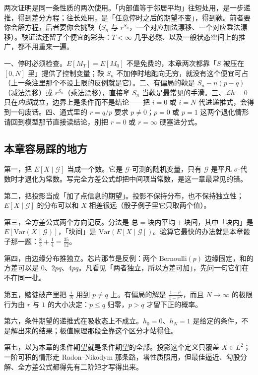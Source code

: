 \begin{remark}
两次证明是同一条性质的两次使用。「内部值等于邻居平均」往短处用，是一步递推，得到差分方程；往长处用，是「任意停时之后的期望不变」，得到鞅。前者要你会解方程，后者要你会挑鞅（$S_n$ 与 $r^{S_n}$，一个对应加法漂移、一个对应乘法漂移）。鞅证法还留了个便宜的彩头：$T<\infty$ 几乎必然、以及一般状态空间上的推广，都不用重来一遍。
\end{remark}

\begin{remark}[顺手记下四条边界]
一、停时必须检查。$E[M_T]=E[M_0]$ 不是免费的，本章两次都靠「$S$ 被压在 $[0,N]$ 里」提供了控制变量；鞅 $S_n$ 不加停时地跑向无穷，就没有这个便宜可占（上一条注里那个不设上限的反例就是它）。二、有偏局的鞅是 $S_n-n(p-q)$（减法漂移）或 $r^{S_n}$（乘法漂移），直接拿 $S_n$ 当鞅是最常见的手滑。三、$\mathcal{L}h=0$ 只在\emph{内部}成立，边界上是条件而不是结论——把 $i=0$ 或 $i=N$ 代进递推式，会得到一句废话。四、通式里的 $r=q/p$ 要求 $p\ne0$；$p=0$ 或 $p=1$ 这两个退化情形请回到模型那节直接读结论，别把 $r=0$ 或 $r=\infty$ 硬塞进分式。
\end{remark}

\subsection{本章容易踩的地方}

第一，把 $E[X\mid\mathcal{G}]$ 当成一个数。它是 $\mathcal{G}$-可测的随机变量，只有 $\mathcal{G}$ 是平凡 $\sigma$-代数时才退化为常数。写完全方差公式却把中间项当常数，是这一章最常见的错。

第二，把投影当成「加了点信息的期望」。投影不保持分布，也不保持独立性；$E[X\mid\mathcal{G}]$ 的分布可以和 $X$ 相差很远（骰子例子里它只取两个值）。

第三，全方差公式两个方向记反。分法是 $\text{总}=\text{块内平均}+\text{块间}$，其中「块内」是 $E[\mathrm{Var}(X\mid\mathcal{G})]$，「块间」是 $\mathrm{Var}(E[X\mid\mathcal{G}])$。验算它最快的办法就是本章骰子那一题：$\frac83+\frac14=\frac{35}{12}$。

第四，由边缘分布推独立。芯片那节是反例：两个 $\mathrm{Bernoulli}(p)$ 边缘固定，和的方差可以是 $0$、$2pq$、$4pq$。凡看见「两者独立，所以方差可加」，先问一句它们在不在同一批。

第五，赌徒破产里把 $\frac iN$ 用到 $p\ne q$ 上。有偏局的解是 $\frac{1-r^i}{1-r^N}$，而且 $N\to\infty$ 的极限行为由 $r$ 与 $1$ 的大小决定：$p\le q$ 归零，$p>q$ 才留下正的概率。

第六，条件期望的递推式在吸收态上不成立。$h_0=0$、$h_N=1$ 是给定的条件，不是解出来的结果；极值原理那段全靠这个区分才站得住。

第七，以为本章的条件期望就是条件期望的全部。投影这个定义只覆盖 $X\in L^2$；一阶可积的情形走 Radon--Nikodym 那条路，塔性质照用，但最佳逼近、勾股分解、全方差公式都得先有二阶矩才写得出来。
